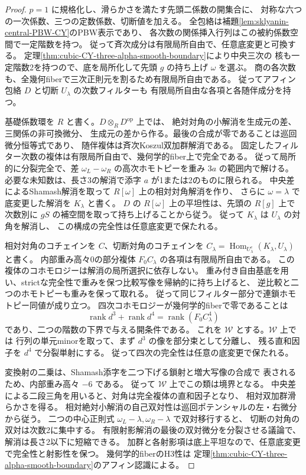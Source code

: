 \begin{proof}
$p=1$ に規格化し、滑らかさを満たす先頭二係数の開集合に、
対称な六つの一次係数、三つの定数係数、切断値を加える。
全包絡は補題\ref{lem:sklyanin-central-PBW-CY}のPBW表示であり、
各次数の関係挿入行列はこの被約係数空間で一定階数を持つ。
従って斉次成分は有限局所自由で、任意底変更と可換する。
定理\ref{thm:cubic-CY-three-alpha-smooth-boundary}により中央三次の
核も一定階数2を持つので、底を局所化して先頭 $g$ の持ち上げ $\omega$ を選ぶ。
商の各次数も、全幾何fiberで三次正則元を割るため有限局所自由である。
従ってアフィン包絡 $D$ と切断 $U_\lambda$ の次数フィルターも
有限局所自由な各項と各随伴成分を持つ。

基礎係数環を $R$ と書く。$D\otimes_R D^{\mathrm{op}}$ 上では、
絶対対角の小解消を生成元の差、三関係の非可換微分、
生成元の差から作る。最後の合成が零であることは巡回微分恒等式であり、
随伴複体は斉次Koszul双加群解消である。
固定したフィルター次数の複体は有限局所自由で、幾何学的fiber上で完全である。
従って局所的に分裂完全で、差
$\omega_L-\omega_R$ の高次ホモトピーを重み $3a$ の範囲内で解ける。
必要な未知数は、長さ3の解消で添字 $a$ が1または2のものに限られる。
中央差によるShamash解消を取って $R[\omega]$ 上の相対対角解消を作り、
さらに $\omega=\lambda$ で底変更した解消を $K_\lambda$ と書く。
$D$ の $R[\omega]$ 上の平坦性は、先頭の $R[g]$ 上で
次数別に $gS$ の補空間を取って持ち上げることから従う。
従って $K_\lambda$ は $U_\lambda$ の対角を解消し、
この構成の完全性は任意底変更で保たれる。

相対対角のコチェインを $C$、切断対角のコチェインを
$C_\lambda=\operatorname{Hom}_{U_\lambda^e}(K_\lambda,U_\lambda)$ と書く。
内部重み高々0の部分複体 $F_0C_\lambda$ の各項は有限局所自由である。
この複体のコホモロジーは解消の局所選択に依存しない。
重み付き自由基底を用い、strictな完全性で重みを保つ比較写像を帰納的に持ち上げると、
逆比較と二つのホモトピーも重みを保って取れる。
従って同じフィルター部分で連鎖ホモトピー同値が成り立つ。
四次コホモロジーが幾何学的fiberで零であることは
\[
 \operatorname{rank} d^3+\operatorname{rank}d^4=\operatorname{rank}(F_0 C_\lambda^4)
\]
であり、二つの階数の下界で与える開条件である。
これを $\mathcal W$ とする。$\mathcal W$ 上では
行列の単元minorを取って、まず $d^3$ の像を部分束として分離し、
残る直和因子を $d^4$ で分裂単射にする。
従って四次の完全性は任意の底変更で保たれる。

変換射の二乗は、Shamash添字を二つ下げる鎖射と増大写像の合成で
表されるため、内部重み高々 $-6$ である。
従って $\mathcal W$ 上でこの類は境界となる。
中央差による二段三角を用いると、対角は完全複体の直和因子となり、
相対双加群滑らかさを得る。
相対絶対小解消の自己双対性は巡回ポテンシャルの左・右微分から従う。
二つの中心正則式 $\omega_L-\lambda,\omega_R-\lambda$ で双対移行すると、
切断の対角の双対は次数2に集中する。
有限射影解消の最後の双対微分を分裂させる議論で、解消は長さ2以下に短縮できる。
加群と各射影項は底上平坦なので、任意底変更で完全性と射影性を保つ。
幾何学的fiberのH3性は
定理\ref{thm:cubic-CY-three-alpha-smooth-boundary}のアフィン認識による。


\end{proof}
